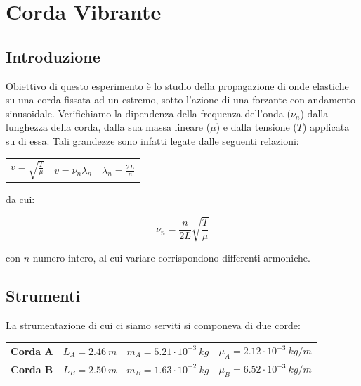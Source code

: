 \chapter{Corda Vibrante}

\section{Introduzione}

Obiettivo di questo esperimento è lo studio della propagazione di onde elastiche su una corda fissata ad un estremo, sotto l'azione di una forzante con andamento sinusoidale. Verifichiamo la dipendenza della frequenza dell'onda ($\nu_n$) dalla lunghezza della corda, dalla sua massa lineare ($\mu$) e dalla tensione ($T$) applicata su di essa. Tali grandezze sono infatti legate dalle seguenti relazioni:
\begin{center}
\begin{tabular}{c c c}
$
v= \sqrt{\frac{T}{\mu}} 
$
&
\hspace{1cm}
$
v= \nu_{n} \lambda_n
$ 
&
\hspace{1cm}
$
\lambda_n= \frac{2L}{n} 
$
\\
\end{tabular}
\end{center}

da cui:

\begin{equation}
\nu_n=\frac{n}{2L}\sqrt{\frac{T}{\mu}}
\end{equation}

con $n$ numero intero, al cui variare corrispondono differenti armoniche.


\section{Strumenti}

La strumentazione di cui ci siamo serviti si componeva di due corde:\\

\begin{tabular}{c c c c}
\textbf{Corda A} & \hspace{1cm} $L_A= 2.46\ m$ & \hspace{1cm} $m_A=5.21\cdot10^{-3}\ kg$ & \hspace{1cm} $\mu_A= 2.12\cdot10^{-3}\ kg/m$\\
\textbf{Corda B} & \hspace{1cm} $L_B= 2.50\ m$ & \hspace{1cm} $m_B=1.63\cdot10^{-2}\ kg$ & \hspace{1cm} $\mu_B= 6.52\cdot10^{-3}\ kg/m$\\
\end{tabular} 
\\

